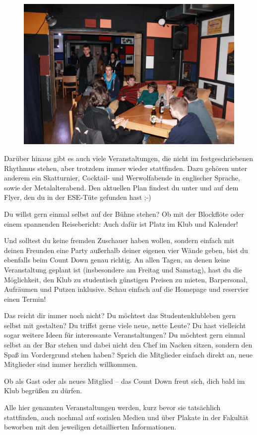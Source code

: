 \begin{figure}%
  \vspace{-.4cm}
  \hspace{.03\linewidth}\includegraphics[width=.96\linewidth]{img/ese2013/cd.jpg}
  \vspace{-.4cm}
\end{figure}

Darüber hinaus gibt es auch viele Veranstaltungen, die nicht im festgeschriebenen Rhythmus stehen, aber trotzdem immer wieder stattfinden.
Dazu gehören unter anderem ein Skatturnier, Cocktail- und Werwolfabende in englischer Sprache, sowie der Metalalterabend.
Den aktuellen Plan findest du unter  und auf dem Flyer, den du in der ESE-Tüte gefunden hast ;-)

Du willst gern einmal selbst auf der Bühne stehen?
Ob mit der Blockflöte oder einem spannenden Reisebericht:
Auch dafür ist Platz im Klub und Kalender!

Und solltest du keine fremden Zuschauer haben wollen, sondern einfach mit deinen Freunden eine Party außerhalb deiner eigenen vier Wände geben, bist du ebenfalls beim Count Down genau richtig.
An allen Tagen, an denen keine Veranstaltung geplant ist (insbesondere am Freitag und Samstag), hast du die Möglichkeit, den Klub zu studentisch günstigen Preisen zu mieten, Barpersonal, Aufräumen und Putzen inklusive.
Schau einfach auf die Homepage und reservier einen Termin!

Das reicht dir immer noch nicht?
Du möchtest das Studentenklubleben gern selbst mit gestalten?
Du triffst gerne viele neue, nette Leute?
Du hast vielleicht sogar weitere Ideen für interessante Veranstaltungen?
Du möchtest gern einmal selbst an der Bar stehen und dabei nicht den Chef im Nacken sitzen, sondern den Spaß im Vordergrund stehen haben?
Sprich die Mitglieder einfach direkt an, neue Mitglieder sind immer herzlich willkommen.

Ob als Gast oder als neues Mitglied -- das Count Down freut sich, dich bald im Klub begrüßen zu dürfen.


Alle hier genannten Veranstaltungen werden, kurz bevor sie tatsächlich stattfinden, auch nochmal auf sozialen Medien und über Plakate in der Fakultät beworben mit den jeweiligen detaillierten Informationen.
